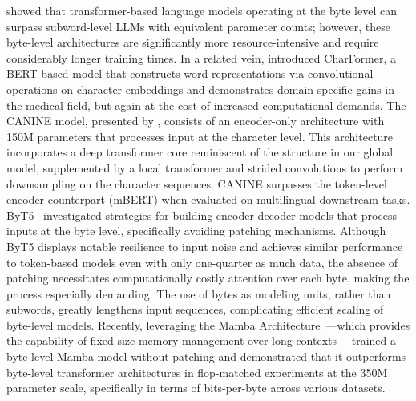 \cite{Choe2019BridgingTG} showed that transformer-based language models operating at the byte level can surpass subword-level LLMs with equivalent parameter counts; however, these byte-level architectures are significantly more resource-intensive and require considerably longer training times. In a related vein, \cite{el2020characterbert} introduced CharFormer, a BERT-based model that constructs word representations via convolutional operations on character embeddings and demonstrates domain-specific gains in the medical field, but again at the cost of increased computational demands. The CANINE model, presented by \cite{clark2022canine}, consists of an encoder-only architecture with 150M parameters that processes input at the character level. This architecture incorporates a deep transformer core reminiscent of the structure in our global model, supplemented by a local transformer and strided convolutions to perform downsampling on the character sequences. CANINE surpasses the token-level encoder counterpart (mBERT) when evaluated on multilingual downstream tasks. ByT5~\citep{xue2022byt5} investigated strategies for building encoder-decoder models that process inputs at the byte level, specifically avoiding patching mechanisms. Although ByT5 displays notable resilience to input noise and achieves similar performance to token-based models even with only one-quarter as much data, the absence of patching necessitates computationally costly attention over each byte, making the process especially demanding. The use of bytes as modeling units, rather than subwords, greatly lengthens input sequences, complicating efficient scaling of byte-level models. Recently, leveraging the Mamba Architecture~\citep{gu2023mamba}—which provides the capability of fixed-size memory management over long contexts—\cite{wang2024mambabyte} trained a byte-level Mamba model without patching and demonstrated that it outperforms byte-level transformer architectures in flop-matched experiments at the 350M parameter scale, specifically in terms of bits-per-byte across various datasets.

